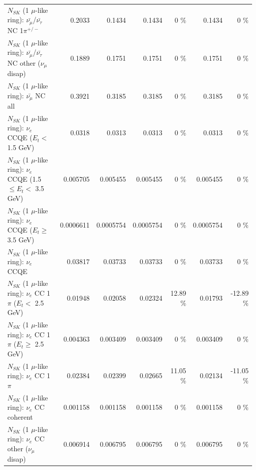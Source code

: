 \begin{table}
\begin{tabular}{| l | r | r | r  r | r  r |}
\hline
  $N_{SK}$ (1 $\mu$-like ring): $\bar{\nu_\mu}$/$\bar{\nu_\tau}$ NC 1$\pi^{+/-}$ &          0.2033 &          0.1434 &          0.1434 &        0 \%  &          0.1434 &        0 \%  \\ 
$N_{SK}$ (1 $\mu$-like ring): $\bar{\nu_\mu}$/$\bar{\nu_\tau}$ NC other ($\nu_\mu$ disap) &          0.1889 &          0.1751 &          0.1751 &        0 \%  &          0.1751 &        0 \%  \\ 
                          $N_{SK}$ (1 $\mu$-like ring): $\bar{\nu_{\mu}}$ NC all &          0.3921 &          0.3185 &          0.3185 &        0 \%  &          0.3185 &        0 \%  \\ 
\hline
\hline
\hline
                  $N_{SK}$ (1 $\mu$-like ring): $\nu_e$ CCQE ($E_{t} <$ 1.5 GeV) &          0.0318 &          0.0313 &          0.0313 &        0 \%  &          0.0313 &        0 \%  \\ 
         $N_{SK}$ (1 $\mu$-like ring): $\nu_e$ CCQE (1.5 $\leq E_{t} <$ 3.5 GeV) &        0.005705 &        0.005455 &        0.005455 &        0 \%  &        0.005455 &        0 \%  \\ 
               $N_{SK}$ (1 $\mu$-like ring): $\nu_e$ CCQE ($E_{t} \geq$ 3.5 GeV) &       0.0006611 &       0.0005754 &       0.0005754 &        0 \%  &       0.0005754 &        0 \%  \\ 
\hline
                                      $N_{SK}$ (1 $\mu$-like ring): $\nu_e$ CCQE &         0.03817 &         0.03733 &         0.03733 &        0 \%  &         0.03733 &        0 \%  \\ 
\hline
             $N_{SK}$ (1 $\mu$-like ring): $\nu_e$ CC 1$\pi$ ($E_{t} <$ 2.5 GeV) &         0.01948 &         0.02058 &         0.02324 &    12.89 \%  &         0.01793 &   -12.89 \%  \\ 
          $N_{SK}$ (1 $\mu$-like ring): $\nu_e$ CC 1$\pi$ ($E_{t} \geq$ 2.5 GeV) &        0.004363 &        0.003409 &        0.003409 &        0 \%  &        0.003409 &        0 \%  \\ 
\hline
                                 $N_{SK}$ (1 $\mu$-like ring): $\nu_e$ CC 1$\pi$ &         0.02384 &         0.02399 &         0.02665 &    11.05 \%  &         0.02134 &   -11.05 \%  \\ 
                               $N_{SK}$ (1 $\mu$-like ring): $\nu_e$ CC coherent &        0.001158 &        0.001158 &        0.001158 &        0 \%  &        0.001158 &        0 \%  \\ 
                $N_{SK}$ (1 $\mu$-like ring): $\nu_e$ CC other ($\nu_\mu$ disap) &        0.006914 &        0.006795 &        0.006795 &        0 \%  &        0.006795 &        0 \%  \\ 

\end{tabular}
\end{table}
